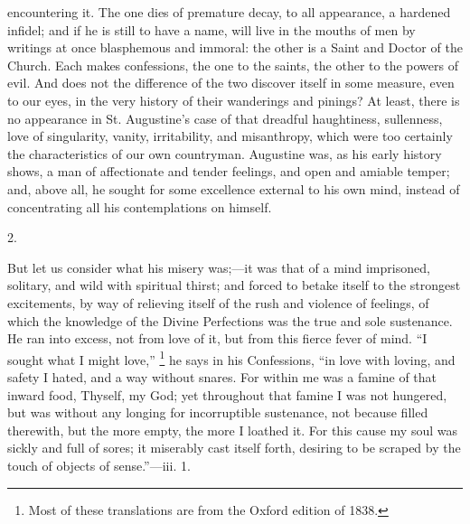 encountering it. The one dies of premature decay, to all appearance, a
hardened infidel; and if he is still to have a name, will live in the
mouths of men by writings at once blasphemous and immoral: the other
is a Saint and Doctor of the Church. Each makes confessions, the one
to the saints, the other to the powers of evil. And does not the
difference of the two discover itself in some measure, even to our
eyes, in the very history of their wanderings and pinings? At least,
there is no appearance in St. Augustine's case of that dreadful
haughtiness, sullenness, love of singularity, vanity, irritability,
and misanthropy, which were too certainly the characteristics of
our own countryman. Augustine was, as his early history shows, a man
of affectionate and tender feelings, and open and amiable temper; and,
above all, he sought for some excellence external to his own mind,
instead of concentrating all his contemplations on himself.

2.

But let us consider what his misery was;—it was that of a mind
imprisoned, solitary, and wild with spiritual thirst; and forced to
betake itself to the strongest excitements, by way of relieving itself
of the rush and violence of feelings, of which the knowledge of the
Divine Perfections was the true and sole sustenance. He ran into
excess, not from love of it, but from this fierce fever of mind.
``I sought what I might love,'' \footnote{Most of these translations are from the Oxford edition of 1838.}
he says in his Confessions, ``in love with loving, and safety I
hated, and a way without snares. For within me was a famine of that
inward food, Thyself, my God; yet throughout that famine I was not
hungered, but was without any longing for incorruptible sustenance,
not because filled therewith, but the more empty, the more I loathed
it. For this cause my soul was sickly and full of sores; it miserably
cast itself forth, desiring to be scraped by the touch of objects of
sense.''—iii. 1.

